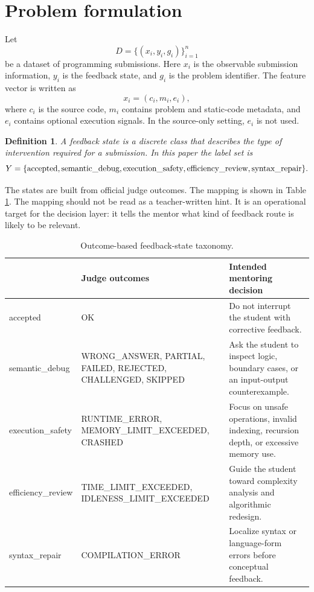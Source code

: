 \documentclass[twoside,11pt]{article}
\newtheorem{definition}{Definition}[section]
\begin{document}
\section{\large Problem formulation}

Let
\[
D=\{(x_i,y_i,g_i)\}_{i=1}^{n}
\]
be a dataset of programming submissions. Here $x_i$ is the observable submission information, $y_i$ is the feedback state, and $g_i$ is the problem identifier. The feature vector is written as
\[
x_i=(c_i,m_i,e_i),
\]
where $c_i$ is the source code, $m_i$ contains problem and static-code metadata, and $e_i$ contains optional execution signals. In the source-only setting, $e_i$ is not used.

\begin{definition}
A feedback state is a discrete class that describes the type of intervention required for a submission. In this paper the label set is
\[
Y=\{\hbox{accepted},\hbox{semantic\_debug},\hbox{execution\_safety},
\hbox{efficiency\_review},\hbox{syntax\_repair}\}.
\]
\end{definition}

The states are built from official judge outcomes. The mapping is shown in Table \ref{tab:taxonomy}. The mapping should not be read as a teacher-written hint. It is an operational target for the decision layer: it tells the mentor what kind of feedback route is likely to be relevant.

\begin{table}[H]
\centering
\small
\caption{Outcome-based feedback-state taxonomy.}
\label{tab:taxonomy}
\begin{tabular}{|>{\raggedright\arraybackslash}p{35mm}|>{\raggedright\arraybackslash}p{48mm}|>{\raggedright\arraybackslash}p{58mm}|}
\hline
{\bf Feedback state} & {\bf Judge outcomes} & {\bf Intended mentoring decision} \\
\hline
accepted & OK & Do not interrupt the student with corrective feedback. \\
\hline
semantic\_debug & WRONG\_ANSWER, PARTIAL, FAILED, REJECTED, CHALLENGED, SKIPPED & Ask the student to inspect logic, boundary cases, or an input-output counterexample. \\
\hline
execution\_safety & RUNTIME\_ERROR, MEMORY\_LIMIT\_EXCEEDED, CRASHED & Focus on unsafe operations, invalid indexing, recursion depth, or excessive memory use. \\
\hline
efficiency\_review & TIME\_LIMIT\_EXCEEDED, IDLENESS\_LIMIT\_EXCEEDED & Guide the student toward complexity analysis and algorithmic redesign. \\
\hline
syntax\_repair & COMPILATION\_ERROR & Localize syntax or language-form errors before conceptual feedback. \\
\hline
\end{tabular}
\end{table}
\end{document}
